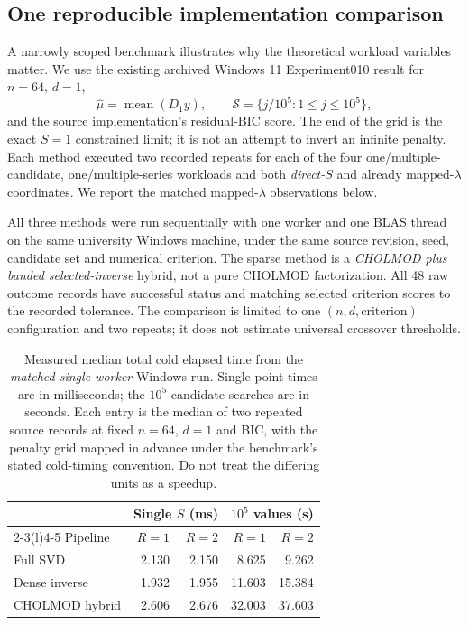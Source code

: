 \subsection{One reproducible implementation comparison}
\label{sec:matched-example}
A narrowly scoped benchmark illustrates why
the theoretical workload variables matter.
We use the existing archived Windows 11
Experiment010 result for $n=64$, $d=1$,
\[
\widehat\mu=\operatorname{mean}(D_1y),
\qquad
\mathcal S=\{j/10^5:1\le j\le10^5\},
\]
and the source implementation's residual-BIC
score. The end of the grid is the exact
$S=1$ constrained limit; it is not an
attempt to invert an infinite penalty.
Each method executed two recorded repeats for
each of the four one/multiple-candidate,
one/multiple-series workloads and both
\emph{direct-$S$} and already mapped-$\lambda$
coordinates. We report the matched
mapped-$\lambda$ observations below.

All three methods were run sequentially with
one worker and one BLAS thread on the same
university Windows machine, under the same
source revision, seed, candidate set and
numerical criterion. The sparse method is
a \emph{CHOLMOD plus banded selected-inverse}
hybrid, not a pure CHOLMOD factorization.
All 48 raw outcome records have successful
status and matching selected criterion scores
to the recorded tolerance. The comparison
is limited to one $(n,d,\text{criterion})$
configuration and two repeats; it does
not estimate universal crossover thresholds.

\begin{table}[tbp]
\centering
\caption{Measured median total cold elapsed time
from the \emph{matched single-worker} Windows run.
Single-point times are in milliseconds; the
$10^5$-candidate searches are in seconds.
Each entry is the median of two repeated source
records at fixed $n=64$, $d=1$ and BIC, with
the penalty grid mapped in advance under the
benchmark's stated cold-timing convention.
Do not treat the differing units as a speedup.}
\label{tab:matched-pilot}
\small
\setlength{\tabcolsep}{6pt}
\renewcommand{\arraystretch}{1.16}
\begin{tabular}{@{}lrrrr@{}}
\toprule
& \multicolumn{2}{c}{Single $S$ (ms)}
& \multicolumn{2}{c}{$10^5$ values (s)}\\
\cmidrule(lr){2-3}\cmidrule(l){4-5}
Pipeline & $R=1$ & $R=2$ & $R=1$ & $R=2$\\
\midrule
Full SVD & 2.130 & 2.150 & 8.625 & 9.262\\
Dense inverse & 1.932 & 1.955 & 11.603 & 15.384\\
CHOLMOD hybrid & 2.606 & 2.676 & 32.003 & 37.603\\
\bottomrule
\end{tabular}
\end{table}

